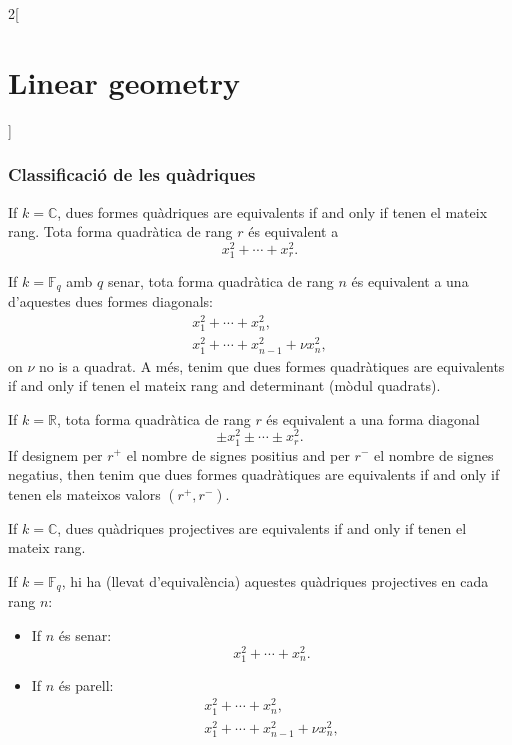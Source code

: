 \documentclass[class=article,10pt,crop=false]{standalone}
\begin{document}
\begin{multicols}{2}[\section{Linear geometry}]
\subsubsection{Classificació de les quàdriques}
\begin{theorem}
If $k=\mathbb{C}$, dues formes quàdriques are equivalents if and only if tenen el mateix rang. Tota forma quadràtica de rang $r$ és equivalent a $$x_1^2+\cdots+x_r^2.$$
\end{theorem}
\begin{theorem}
If $k=\mathbb{F}_q$ amb $q$ senar, tota forma quadràtica
de rang $n$ és equivalent a una d'aquestes dues formes diagonals: 
\begin{gather*}
    x_1^2+\cdots+ x_n^2,\\
    x_1^2+\cdots+ x_{n-1}^2+\nu x_n^2,
\end{gather*}
on $\nu$ no is a quadrat. A més, tenim que dues formes quadràtiques are equivalents if and only if tenen el mateix rang and determinant (mòdul quadrats).
\end{theorem}
\begin{theorem}
If $k=\mathbb{R}$, tota forma quadràtica
de rang $r$ és equivalent a una forma diagonal 
$$\pm x_1^2\pm\cdots\pm x_r^2.$$ If designem per $r^+$ el nombre de signes positius and per $r^-$ el nombre de signes negatius, then tenim que dues formes quadràtiques are equivalents if and only if tenen els mateixos valors $(r^+,r^-)$.
\end{theorem}
\begin{theorem}
If $k=\mathbb{C}$, dues quàdriques projectives are equivalents if and only if tenen el mateix rang.
\end{theorem}
\begin{theorem}
If $k=\mathbb{F}_q$, hi ha (llevat d'equivalència) aquestes quàdriques projectives en cada rang $n$:
\begin{itemize}
    \item If $n$ és senar: $$\displaystyle x_1^2+\cdots+ x_n^2.$$
    \item If $n$ és parell: \begin{gather*}
    x_1^2+\cdots+ x_n^2,\\
    x_1^2+\cdots+ x_{n-1}^2+\nu x_n^2,
\end{gather*}

\end{itemize}
\end{theorem}
\end{multicols}
\end{document}
